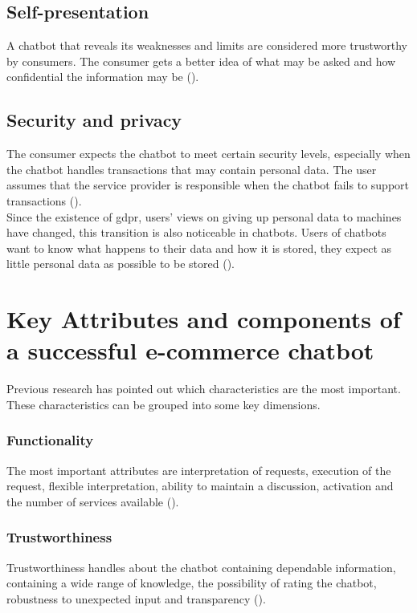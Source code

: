 \subsection{Self-presentation}
A chatbot that reveals its weaknesses and limits are considered more trustworthy by consumers. The consumer gets a better idea of what may be asked and how confidential the information may be (\cite{Folstad2018}).

\subsection{Security and privacy}
The consumer expects the chatbot to meet certain security levels, especially when the chatbot handles transactions that may contain personal data. The user assumes that the service provider is responsible when the chatbot fails to support transactions (\cite{Folstad2018, Nordheim2019}).\\
\break
Since the existence of \acrfull{gdpr}, users' views on giving up personal data to machines have changed, this transition is also noticeable in chatbots. Users of chatbots want to know what happens to their data and how it is stored, they expect as little personal data as possible to be stored (\cite{Folstad2018, Nordheim2019}). 


\section{Key Attributes and components of a successful e-commerce chatbot}
Previous research has pointed out which characteristics are the most important. These characteristics can be grouped into some key dimensions.\\

\subsubsection{Functionality}
The most important attributes are interpretation of requests, execution of the request, flexible interpretation, ability to maintain a discussion, activation and the number of services available (\cite{Muizzah2021, Verkeyn2018}).\\

\subsubsection{Trustworthiness}
Trustworthiness handles about the chatbot containing dependable information, containing a wide range of knowledge, the possibility of rating the chatbot, robustness to unexpected input and transparency (\cite{Muizzah2021, Verkeyn2018}).

